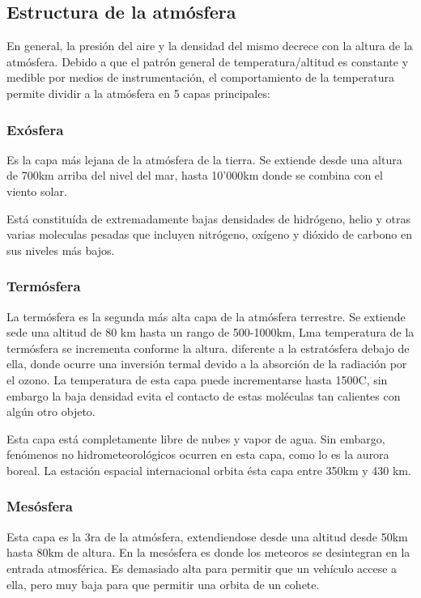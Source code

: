 \documentclass{article}
\begin{document}
\subsection{Estructura de la atmósfera}
En general, la presión del aire y la densidad del mismo decrece con la altura de la atmósfera. Debido a que el patrón general de temperatura/altitud es constante y medible por medios de instrumentación, el comportamiento de la temperatura permite dividir a la atmósfera en 5 capas principales:

\subsubsection{Exósfera}
Es la capa más lejana de la atmósfera de la tierra. Se extiende desde una altura de 700km arriba del nivel del mar, hasta 10'000km donde se combina con el viento solar.

Está constituída de extremadamente bajas densidades de hidrógeno, helio y otras varias moleculas pesadas que incluyen nitrógeno, oxígeno y dióxido de carbono en sus niveles más bajos.

\subsubsection{Termósfera}
La termósfera es la segunda más alta capa de la atmósfera terrestre. Se extiende sede una altitud de 80 km hasta un rango de 500-1000km, Lma temperatura de la termósfera se incrementa conforme la altura. diferente a la estratósfera debajo de ella, donde ocurre una inversión termal devido a la absorción de la radiación por el ozono. La temperatura de esta capa puede incrementarse hasta 1500C, sin embargo la baja densidad evita el contacto de estas moléculas tan calientes con algún otro objeto.

Esta capa está completamente libre de nubes y vapor de agua. Sin embargo, fenómenos no hidrometeorológicos ocurren en esta capa, como lo es la aurora boreal. La estación espacial internacional orbita ésta capa entre 350km y 430 km.

\subsubsection{Mesósfera}
Esta capa es la 3ra de la atmósfera, extendiendose desde una altitud desde 50km hasta 80km de altura.
En la mesósfera es donde los meteoros se desintegran en la entrada atmosférica. Es demasiado alta para permitir que un vehículo accese a ella, pero muy baja para que permitir una orbita de un cohete.
\end{document}
